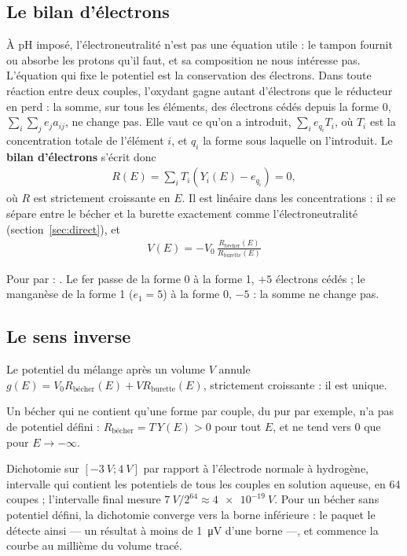 \documentclass[a4paper,11pt]{article}
\newcommand\logo[1]{\hspace{-12pt}\makebox[12pt][l]{#1}}
\newcommand\rmqcons[1]{\begin{tcolorbox}[rmq, rouge, fontupper=\small\itshape]\logo{\ding{43}}#1\end{tcolorbox}}
\newcommand\gras[1]{\textbf{#1}}
\newcommand\rsltm[1]{\boxed{#1}}
\newcommand\pH{\ensuremath{\mathrm{pH}}\xspace}
\newcommand\pare[1]{\left(#1\right)}
\newcommand\Rb{R_\text{bécher}}
\newcommand\Ru{R_\text{burette}}
\begin{document}
\subsection{Le bilan d'électrons}
À \pH imposé, l'électroneutralité n'est pas une équation utile : le tampon fournit ou absorbe les protons qu'il faut, et sa composition ne nous intéresse pas.
L'équation qui fixe le potentiel est la conservation des électrons.
Dans toute réaction entre deux couples, l'oxydant gagne autant d'électrons que le réducteur en perd : la somme, sur tous les éléments, des électrons cédés depuis la forme 0, $\sum_i\sum_je_ja_{ij}$, ne change pas.
Elle vaut ce qu'on a introduit, $\sum_ie_{q_i}T_i$, où $T_i$ est la concentration totale de l'élément $i$, et $q_i$ la forme sous laquelle on l'introduit.
Le \gras{bilan d'électrons} s'écrit donc
\begin{align}
R(E)=\sum_iT_i\pare{Y_i(E)-e_{q_i}}=0,
\end{align}
où $R$ est strictement croissante en $E$.
Il est linéaire dans les concentrations : il se sépare entre le bécher et la burette exactement comme l'électroneutralité (section~\ref{sec:direct}), et
\begin{align}
\rsltm{V(E)=-V_0\,\frac{\Rb(E)}{\Ru(E)}}
\end{align}
\rmqcons{Pour  par  : \ce{5 Fe^2+ + MnO4- + 8 H+ -> 5 Fe^3+ + Mn^2+ + 4 H2O}.
Le fer passe de la forme 0 à la forme 1, $+5$ électrons cédés ; le manganèse de la forme 1 ($e_1=5$) à la forme 0, $-5$ : la somme ne change pas.}

\subsection{Le sens inverse}
Le potentiel du mélange après un volume $V$ annule $g(E)=V_0\Rb(E)+V\Ru(E)$, strictement croissante : il est unique.
\rmqcons{Un bécher qui ne contient qu'une forme par couple, du \ce{Fe^2+} pur par exemple, n'a pas de potentiel défini : $\Rb=T\,Y(E)>0$ pour tout $E$, et ne tend vers 0 que pour $E\to-\infty$.}
\begin{algo}
Dichotomie sur $[\qty{-3}{V};\qty{4}{V}]$ par rapport à l'électrode normale à hydrogène, intervalle qui contient les potentiels de tous les couples en solution aqueuse, en 64 coupes ; l'intervalle final mesure $\qty{7}{V}/2^{64}\approx\qty{4e-19}{V}$.
Pour un bécher sans potentiel défini, la dichotomie converge vers la borne inférieure : le paquet le détecte ainsi — un résultat à moins de \qty{1}{\micro V} d'une borne —, et commence la courbe au millième du volume tracé.
\end{algo}
\end{document}
